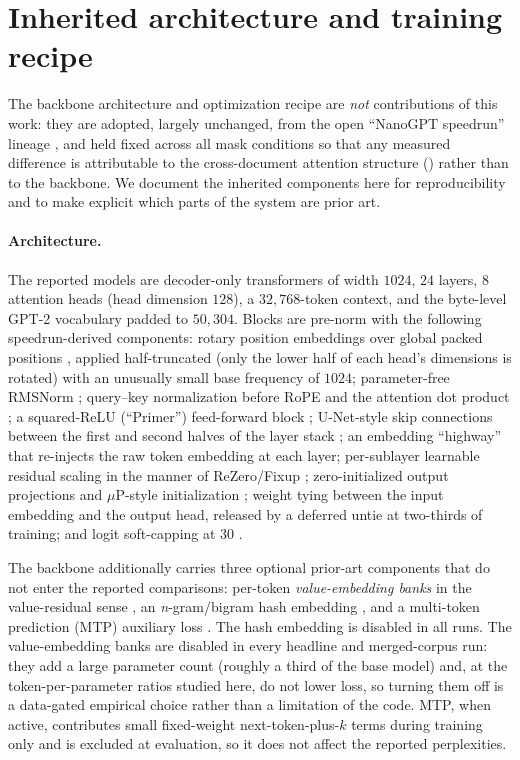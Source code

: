 \section{Inherited architecture and training recipe}
\label{app:recipe}

The backbone architecture and optimization recipe are \emph{not} contributions of
this work: they are adopted, largely unchanged, from the open ``NanoGPT speedrun''
lineage \citep{jordan2024moddednanogpt,karpathy2022nanogpt}, and held fixed across
all mask conditions so that any measured difference is attributable to the
cross-document attention structure () rather than to the backbone.
We document the inherited components here for reproducibility and to make explicit
which parts of the system are prior art.

\paragraph{Architecture.}
The reported models are decoder-only transformers of width $1024$, $24$ layers,
$8$ attention heads (head dimension $128$), a $32{,}768$-token context, and the
byte-level GPT-2 vocabulary padded to $50{,}304$. Blocks are pre-norm with the
following speedrun-derived components: rotary position embeddings over global packed
positions \citep{su2021roformer}, applied half-truncated (only the lower half of each
head's dimensions is rotated) with an unusually small base frequency of $1024$;
parameter-free RMSNorm \citep{zhang2019rmsnorm}; query--key normalization before RoPE
and the attention dot product \citep{henry2020qknorm}; a squared-ReLU (``Primer'')
feed-forward block \citep{so2021primer}; U-Net-style skip connections between the
first and second halves of the layer stack \citep{ronneberger2015unet}; an embedding
``highway'' that re-injects the raw token embedding at each layer; per-sublayer
learnable residual scaling in the manner of ReZero/Fixup
\citep{bachlechner2020rezero,zhang2019fixup}; zero-initialized output projections and
$\mu$P-style initialization \citep{yang2022tensorprogramsv}; weight tying between the
input embedding and the output head, released by a deferred untie at two-thirds of
training; and logit soft-capping at $30$ \citep{gemmateam2024gemma2}.

The backbone additionally carries three optional prior-art components that do not
enter the reported comparisons: per-token \emph{value-embedding banks} in the
value-residual sense \citep{zhou2024valueresidual}, an \emph{n}-gram/bigram hash
embedding \citep{roy2022ngrammer,svenstrup2017hashembeddings}, and a multi-token
prediction (MTP) auxiliary loss \citep{gloeckle2024mtp}. The hash embedding is
disabled in all runs. The value-embedding banks are disabled in every headline and
merged-corpus run: they add a large parameter count (roughly a third of the base
model) and, at the token-per-parameter ratios studied here, do not lower loss, so
turning them off is a data-gated empirical choice rather than a limitation of the
code. MTP, when active, contributes small fixed-weight next-token-plus-$k$ terms
during training only and is excluded at evaluation, so it does not affect the
reported perplexities.

